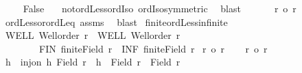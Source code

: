 \begin{isabellebody}
\ \ \ \isamarkupfalse%
\ False\ \isamarkupfalse%
\ {\isacharasterisk}{\kern0pt}\ not{\isacharunderscore}{\kern0pt}ordLess{\isacharunderscore}{\kern0pt}ordIso\ ordIso{\isacharunderscore}{\kern0pt}symmetric\ \isamarkupfalse%
\ blast\isanewline
\ \ \isacommand{{\isacharbraceright}{\kern0pt}}\isamarkupfalse%
\isanewline
\ \ \isamarkupfalse%
\ {\isachardoublequoteopen}r\ {\isasymle}o\ r{\isacharprime}{\kern0pt}{\isachardoublequoteclose}\ \isamarkupfalse%
\ ordLess{\isacharunderscore}{\kern0pt}or{\isacharunderscore}{\kern0pt}ordLeq\ assms\ \isamarkupfalse%
\ blast\isanewline
{}\isamarkupfalse%
%
\endisatagproof
{\isafoldproof}%
%
\isadelimproof
\isanewline
%
\endisadelimproof
\isanewline
{}\isamarkupfalse%
\ finite{\isacharunderscore}{\kern0pt}ordLess{\isacharunderscore}{\kern0pt}infinite{\isacharcolon}{\kern0pt}\isanewline
{}\ WELL{\isacharcolon}{\kern0pt}\ {\isachardoublequoteopen}Well{\isacharunderscore}{\kern0pt}order\ r{\isachardoublequoteclose}\ \ WELL{\isacharprime}{\kern0pt}{\isacharcolon}{\kern0pt}\ {\isachardoublequoteopen}Well{\isacharunderscore}{\kern0pt}order\ r{\isacharprime}{\kern0pt}{\isachardoublequoteclose}\ \isanewline
\ \ \ \ \ \ \ \ FIN{\isacharcolon}{\kern0pt}\ {\isachardoublequoteopen}finite{\isacharparenleft}{\kern0pt}Field\ r{\isacharparenright}{\kern0pt}{\isachardoublequoteclose}\ \ INF{\isacharcolon}{\kern0pt}\ {\isachardoublequoteopen}{\isasymnot}finite{\isacharparenleft}{\kern0pt}Field\ r{\isacharprime}{\kern0pt}{\isacharparenright}{\kern0pt}{\isachardoublequoteclose}\isanewline
{}\ {\isachardoublequoteopen}r\ {\isacharless}{\kern0pt}o\ r{\isacharprime}{\kern0pt}{\isachardoublequoteclose}\isanewline
%
\isadelimproof
%
\endisadelimproof
%
\isatagproof
{}\isamarkupfalse%
{\isacharminus}{\kern0pt}\isanewline
\ \ \isacommand{{\isacharbraceleft}{\kern0pt}}\isamarkupfalse%
\isamarkupfalse%
\ {\isachardoublequoteopen}r{\isacharprime}{\kern0pt}\ {\isasymle}o\ r{\isachardoublequoteclose}\isanewline
\ \ \ \isamarkupfalse%
\ \isamarkupfalse%
\ h\ \ {\isachardoublequoteopen}inj{\isacharunderscore}{\kern0pt}on\ h\ {\isacharparenleft}{\kern0pt}Field\ r{\isacharprime}{\kern0pt}{\isacharparenright}{\kern0pt}\ {\isasymand}\ h\ {\isacharbackquote}{\kern0pt}\ {\isacharparenleft}{\kern0pt}Field\ r{\isacharprime}{\kern0pt}{\isacharparenright}{\kern0pt}\ {\isasymle}\ Field\ r{\isachardoublequoteclose}\isanewline

\end{isabellebody}
